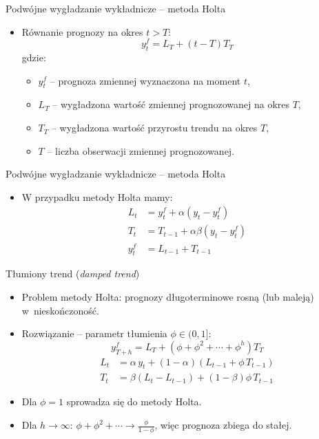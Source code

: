 \documentclass[11pt,usenames,dvipsnames,aspectratio=169]{beamer}
\begin{document}
\begin{frame}{Podwójne wygładzanie wykładnicze -- metoda Holta}
\begin{itemize}
    \item Równanie prognozy na okres $t>T$:
    \[
    y_{t}^{f}=L_{T}+\left(t-T\right)T_{T}
    \]
    gdzie:
    \begin{itemize}
        \item $y_{t}^{f}$ -- prognoza zmiennej wyznaczona na moment $t$,
        \item $L_{T}$ -- wygładzona wartość zmiennej prognozowanej na okres $T$,
        \item $T_{T}$ -- wygładzona wartość przyrostu trendu na okres $T$,
        \item $T$ -- liczba obserwacji zmiennej prognozowanej.
    \end{itemize}
\end{itemize}
\end{frame}

\begin{frame}{Podwójne wygładzanie wykładnicze -- metoda Holta}
\begin{itemize}
    \item W przypadku metody Holta mamy:
    \begin{align*}
    L_{t} &= y_{t}^{f}+\alpha\left(y_{t}-y_{t}^{f}\right)\\
    T_{t} &= T_{t-1}+\alpha\beta\left(y_{t}-y_{t}^{f}\right)\\
    y_{t}^{f} &= L_{t-1}+T_{t-1}
    \end{align*}
\end{itemize}
\end{frame}

\begin{frame}{Tłumiony trend (\emph{damped trend})}
\begin{itemize}
    \item Problem metody Holta: prognozy długoterminowe rosną (lub maleją) w~nieskończoność.
    \item Rozwiązanie -- parametr tłumienia $\phi\in(0,1]$:
    \[
    y_{T+h}^{f}=L_{T}+\left(\phi+\phi^{2}+\cdots+\phi^{h}\right)T_{T}
    \]
    \begin{align*}
    L_{t} &= \alpha\, y_{t}+\left(1-\alpha\right)\!\left(L_{t-1}+\phi\, T_{t-1}\right)\\
    T_{t} &= \beta\left(L_{t}-L_{t-1}\right)+\left(1-\beta\right)\phi\, T_{t-1}
    \end{align*}
    \item Dla $\phi=1$ sprowadza się do metody Holta.
    \item Dla $h\to\infty$: $\phi+\phi^{2}+\cdots\to\frac{\phi}{1-\phi}$, więc prognoza zbiega do stałej.
\end{itemize}
\end{frame}
\end{document}
